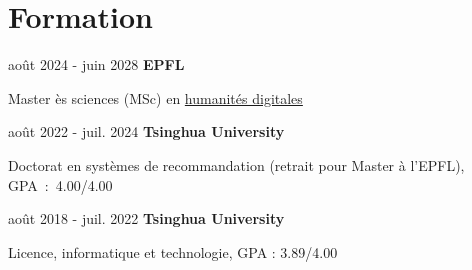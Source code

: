 \section{Formation}



        \begin{twocolentry}{
            août 2024 - juin 2028
        }
        \textbf{EPFL}


        Master ès sciences (MSc) en \href{https://www.epfl.ch/education/master/programs/digital-humanities/}{humanités digitales}\end{twocolentry}

        \vspace{0.10 cm}

        \begin{twocolentry}{
            août 2022 - juil. 2024
        }
        \textbf{Tsinghua University}

        Doctorat en systèmes de recommandation (retrait pour Master à l'EPFL), GPA~:~4.00/4.00\end{twocolentry}
        \vspace{0.10 cm}


        \begin{twocolentry}{
            août 2018 - juil. 2022
        }
        \textbf{Tsinghua University}

        Licence, informatique et technologie, GPA : 3.89/4.00
        \end{twocolentry}


